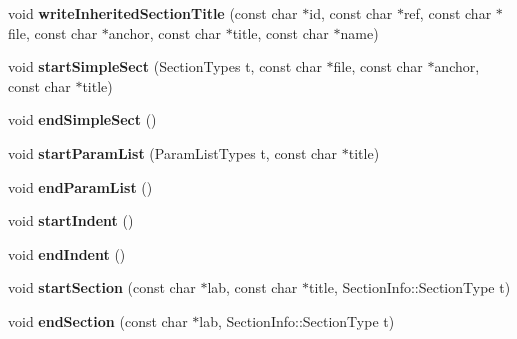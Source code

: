 \begin{DoxyCompactItemize}
\item 
\hypertarget{class_output_list_aa2c613cc72d6c92ca6ab9a8e6af0948c}{void {\bfseries write\-Inherited\-Section\-Title} (const char $\ast$id, const char $\ast$ref, const char $\ast$file, const char $\ast$anchor, const char $\ast$title, const char $\ast$name)}\label{class_output_list_aa2c613cc72d6c92ca6ab9a8e6af0948c}

\item 
\hypertarget{class_output_list_a8d8f83f72ee98aa7784cde735ea2e9e9}{void {\bfseries start\-Simple\-Sect} (Section\-Types t, const char $\ast$file, const char $\ast$anchor, const char $\ast$title)}\label{class_output_list_a8d8f83f72ee98aa7784cde735ea2e9e9}

\item 
\hypertarget{class_output_list_a845408bbcbfed31523c20fd170dd8b45}{void {\bfseries end\-Simple\-Sect} ()}\label{class_output_list_a845408bbcbfed31523c20fd170dd8b45}

\item 
\hypertarget{class_output_list_a690d000267c59d01eec35f2c76d60a95}{void {\bfseries start\-Param\-List} (Param\-List\-Types t, const char $\ast$title)}\label{class_output_list_a690d000267c59d01eec35f2c76d60a95}

\item 
\hypertarget{class_output_list_a0cea756e6f65da408378bedffe2b67d1}{void {\bfseries end\-Param\-List} ()}\label{class_output_list_a0cea756e6f65da408378bedffe2b67d1}

\item 
\hypertarget{class_output_list_a34fb23b9705fd9c97bfb8730b5667822}{void {\bfseries start\-Indent} ()}\label{class_output_list_a34fb23b9705fd9c97bfb8730b5667822}

\item 
\hypertarget{class_output_list_a3e925c49464a35005365e14899e6c0a8}{void {\bfseries end\-Indent} ()}\label{class_output_list_a3e925c49464a35005365e14899e6c0a8}

\item 
\hypertarget{class_output_list_a49cd81f5922e473e13f3a232e4c860dc}{void {\bfseries start\-Section} (const char $\ast$lab, const char $\ast$title, Section\-Info\-::\-Section\-Type t)}\label{class_output_list_a49cd81f5922e473e13f3a232e4c860dc}

\item 
\hypertarget{class_output_list_a63e9f586117c9b5372199256461c7661}{void {\bfseries end\-Section} (const char $\ast$lab, Section\-Info\-::\-Section\-Type t)}\label{class_output_list_a63e9f586117c9b5372199256461c7661}


\end{DoxyCompactItemize}
